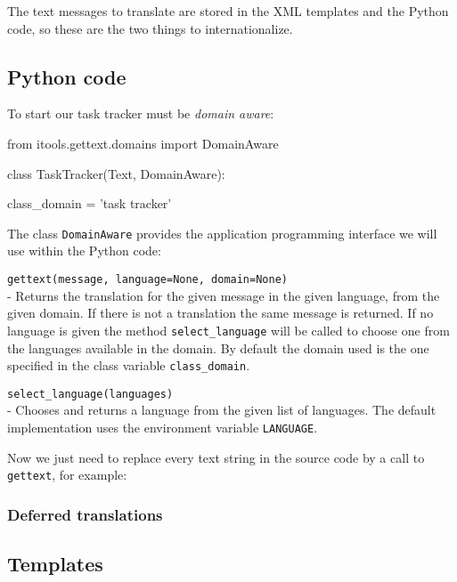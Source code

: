The text messages to translate are stored in the XML templates and the Python
code, so these are the two things to internationalize.

\subsection{Python code}

To start our task tracker must be {\em domain aware}:

\begin{code}
    from itools.gettext.domains import DomainAware

    class TaskTracker(Text, DomainAware):

        class_domain = 'task tracker'
\end{code}

The class {\tt DomainAware} provides the application programming interface
we will use within the Python code:

\begin{api}
  {\tt gettext(message, language=None, domain=None)}\\
  - Returns the translation for the given message in the given language,
    from the given domain. If there is not a translation the same message
    is returned. If no language is given the method {\tt select\_language}
    will be called to choose one from the languages available in the
    domain. By default the domain used is the one specified in the class
    variable {\tt class\_domain}.

  {\tt select\_language(languages)}\\
  - Chooses and returns a language from the given list of languages. The
    default implementation uses the environment variable {\tt LANGUAGE}.
\end{api}

Now we just need to replace every text string in the source code by a
call to {\tt gettext}, for example:

\begin{code}
\end{code}


\subsubsection{Deferred translations}




\subsection{Templates}



